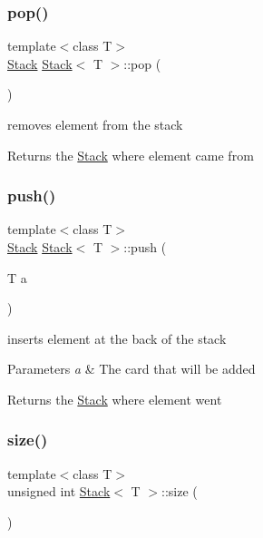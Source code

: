 \subsubsection{\texorpdfstring{pop()}{pop()}}
{\footnotesize\ttfamily template$<$class T$>$ \\
\mbox{\hyperlink{class_stack}{Stack}} \mbox{\hyperlink{class_stack}{Stack}}$<$ T $>$\+::pop (\begin{DoxyParamCaption}{ }\end{DoxyParamCaption})}



removes element from the stack 

\begin{DoxyReturn}{Returns}
the \mbox{\hyperlink{class_stack}{Stack}} where element came from 
\end{DoxyReturn}
\mbox{\label{class_stack_a7215a80f65ed859c6cca06f76e44da88}} 
\subsubsection{\texorpdfstring{push()}{push()}}
{\footnotesize\ttfamily template$<$class T$>$ \\
\mbox{\hyperlink{class_stack}{Stack}} \mbox{\hyperlink{class_stack}{Stack}}$<$ T $>$\+::push (\begin{DoxyParamCaption}\item[{T}]{a }\end{DoxyParamCaption})}



inserts element at the back of the stack 


\begin{DoxyParams}{Parameters}
{\em a} & The card that will be added \\
\hline
\end{DoxyParams}
\begin{DoxyReturn}{Returns}
the \mbox{\hyperlink{class_stack}{Stack}} where element went 
\end{DoxyReturn}
\mbox{\label{class_stack_ab04985802f97ae3555289c865462bf7f}} 
\subsubsection{\texorpdfstring{size()}{size()}}
{\footnotesize\ttfamily template$<$class T$>$ \\
unsigned int \mbox{\hyperlink{class_stack}{Stack}}$<$ T $>$\+::size (\begin{DoxyParamCaption}{ }\end{DoxyParamCaption})}




